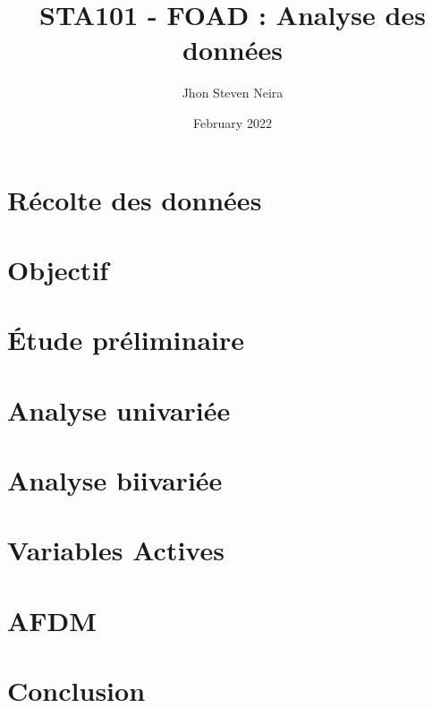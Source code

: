 \documentclass[12pt, a4paper]{article}
\title{STA101 - FOAD : Analyse des données}
\author{Jhon Steven Neira}
\date{February 2022}
\begin{document}
  
\maketitle
  
\tableofcontents

\section{Récolte des  données }


\section{Objectif}






\section{Étude préliminaire}



\section{Analyse univariée}



\section{Analyse biivariée}


\section{Variables Actives}


\section{AFDM }


\section{Conclusion }


         
\end{document}
